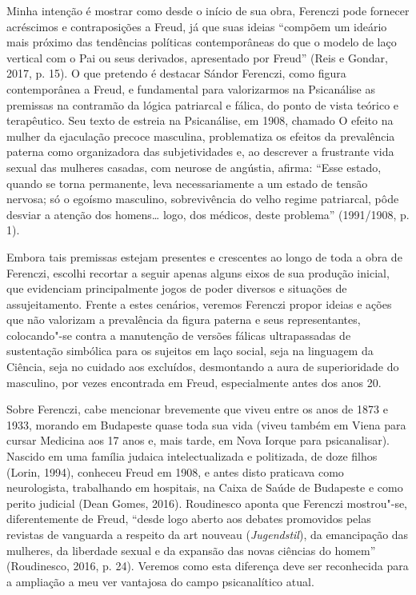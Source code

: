 Minha intenção é mostrar como desde o início de sua obra, Ferenczi pode
fornecer acréscimos e contraposições a Freud, já que suas ideias
``compõem um ideário mais próximo das tendências políticas
contemporâneas do que o modelo de laço vertical com o Pai ou seus
derivados, apresentado por Freud'' (Reis e Gondar, 2017, p. 15). O que
pretendo é destacar Sándor Ferenczi, como figura contemporânea a Freud,
e fundamental para valorizarmos na Psicanálise as premissas na contramão
da lógica patriarcal e fálica, do ponto de vista teórico e terapêutico.
Seu texto de estreia na Psicanálise, em 1908, chamado O efeito na mulher
da ejaculação precoce masculina, problematiza os efeitos da prevalência
paterna como organizadora das subjetividades e, ao descrever a
frustrante vida sexual das mulheres casadas, com neurose de angústia,
afirma: ``Esse estado, quando se torna permanente, leva necessariamente
a um estado de tensão nervosa; só o egoísmo masculino, sobrevivência do
velho regime patriarcal, pôde desviar a atenção dos homens\ldots{} logo, dos
médicos, deste problema'' (1991/1908, p. 1).

Embora tais premissas estejam presentes e crescentes ao longo de toda a
obra de Ferenczi, escolhi recortar a seguir apenas alguns eixos de sua
produção inicial, que evidenciam principalmente jogos de poder diversos
e situações de assujeitamento. Frente a estes cenários, veremos Ferenczi
propor ideias e ações que não valorizam a prevalência da figura paterna
e seus representantes, colocando"-se contra a manutenção de versões
fálicas ultrapassadas de sustentação simbólica para os sujeitos em laço
social, seja na linguagem da Ciência, seja no cuidado aos excluídos,
desmontando a aura de superioridade do masculino, por vezes encontrada
em Freud, especialmente antes dos anos 20.

Sobre Ferenczi, cabe mencionar brevemente que viveu entre os anos de
1873 e 1933, morando em Budapeste quase toda sua vida (viveu também em
Viena para cursar Medicina aos 17 anos e, mais tarde, em Nova Iorque
para psicanalisar). Nascido em uma família judaica intelectualizada e
politizada, de doze filhos (Lorin, 1994), conheceu Freud em 1908, e
antes disto praticava como neurologista, trabalhando em hospitais, na
Caixa de Saúde de Budapeste e como perito judicial (Dean Gomes, 2016).
Roudinesco aponta que Ferenczi mostrou"-se, diferentemente de Freud,
``desde logo aberto aos debates promovidos pelas revistas de vanguarda a
respeito da art nouveau (\emph{Jugendstil}), da emancipação das
mulheres, da liberdade sexual e da expansão das novas ciências do
homem'' (Roudinesco, 2016, p. 24). Veremos como esta diferença deve ser
reconhecida para a ampliação a meu ver vantajosa do campo psicanalítico
atual.

